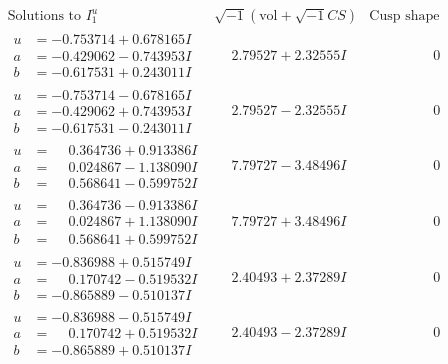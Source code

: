 \documentclass[1p]{elsarticle_modified}
\theoremstyle{definition}
\newcommand{\I}{\sqrt{-1}}
\begin{document}
$$\begin{array}{c|c|c}  
\text{Solutions to }I^u_{1}& \I (\text{vol} + \sqrt{-1}CS) & \text{Cusp shape}\\
 \hline 
\begin{aligned}
u &= -0.753714 + 0.678165 I \\
a &= -0.429062 - 0.743953 I \\
b &= -0.617531 + 0.243011 I\end{aligned}
 & \phantom{-}2.79527 + 2.32555 I & \phantom{-0.000000 } 0 \\ \hline\begin{aligned}
u &= -0.753714 - 0.678165 I \\
a &= -0.429062 + 0.743953 I \\
b &= -0.617531 - 0.243011 I\end{aligned}
 & \phantom{-}2.79527 - 2.32555 I & \phantom{-0.000000 } 0 \\ \hline\begin{aligned}
u &= \phantom{-}0.364736 + 0.913386 I \\
a &= \phantom{-}0.024867 - 1.138090 I \\
b &= \phantom{-}0.568641 - 0.599752 I\end{aligned}
 & \phantom{-}7.79727 - 3.48496 I & \phantom{-0.000000 } 0 \\ \hline\begin{aligned}
u &= \phantom{-}0.364736 - 0.913386 I \\
a &= \phantom{-}0.024867 + 1.138090 I \\
b &= \phantom{-}0.568641 + 0.599752 I\end{aligned}
 & \phantom{-}7.79727 + 3.48496 I & \phantom{-0.000000 } 0 \\ \hline\begin{aligned}
u &= -0.836988 + 0.515749 I \\
a &= \phantom{-}0.170742 - 0.519532 I \\
b &= -0.865889 - 0.510137 I\end{aligned}
 & \phantom{-}2.40493 + 2.37289 I & \phantom{-0.000000 } 0 \\ \hline\begin{aligned}
u &= -0.836988 - 0.515749 I \\
a &= \phantom{-}0.170742 + 0.519532 I \\
b &= -0.865889 + 0.510137 I\end{aligned}
 & \phantom{-}2.40493 - 2.37289 I & \phantom{-0.000000 } 0 \\ \hline\begin{aligned}

\end{aligned}
\end{array}$$
\end{document}
